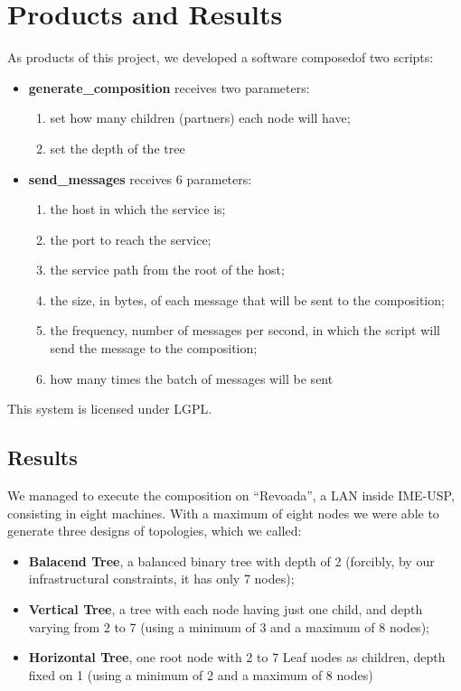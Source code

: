 \section{Products and Results}

As products of this project, we developed a software composedof two scripts:
\begin{itemize}
	\item \textbf{generate\_composition} receives two parameters:
	\begin{enumerate}
		\item set how many children (partners) each node will have;
		\item set the depth of the tree
	\end{enumerate}
	\item \textbf{send\_messages} receives 6 parameters:
	\begin{enumerate}
		\item the host in which the service is;
		\item the port to reach the service;
		\item the service path from the root of the host;
		\item the size, in bytes, of each message that will be sent to the composition;
		\item the frequency, number of messages per second, in which the script will send the message to the composition;
		\item how many times the batch of messages will be sent
	\end{enumerate}
\end{itemize}

This system is licensed under LGPL.

\subsection{Results}
We managed to execute the composition on ``Revoada'', a LAN inside IME-USP, consisting in eight machines. With a maximum of eight nodes we were able to generate three designs of topologies, which we called:

\begin{itemize}
	\item \textbf{Balacend Tree}, a balanced binary tree with depth of 2 (forcibly, by our infrastructural constraints, it has only 7 nodes);
	\item \textbf{Vertical Tree}, a tree with each node having just one child, and depth varying from 2 to 7 (using a minimum of 3 and a maximum of 8 nodes);
	\item \textbf{Horizontal Tree}, one root node with 2 to 7 Leaf nodes as children, depth fixed on 1 (using a minimum of 2 and a maximum of 8 nodes)
\end{itemize}

